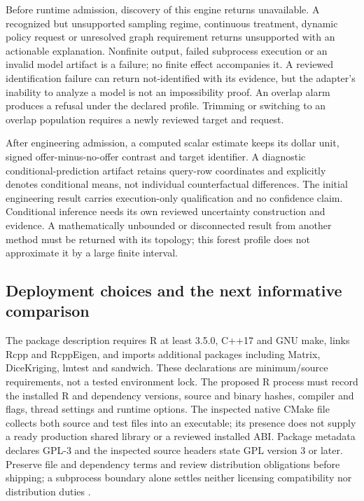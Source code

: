 Before runtime admission, discovery of this engine returns unavailable.
A recognized but unsupported sampling regime, continuous treatment,
dynamic policy request or unresolved graph requirement returns
unsupported with an actionable explanation. Nonfinite output, failed
subprocess execution or an invalid model artifact is a failure; no
finite effect accompanies it. A reviewed identification failure can
return not-identified with its evidence, but the adapter's inability to
analyze a model is not an impossibility proof. An overlap alarm produces
a refusal under the declared profile. Trimming or switching to an
overlap population requires a newly reviewed target and request.

After engineering admission, a computed scalar estimate keeps its dollar
unit, signed offer-minus-no-offer contrast and target identifier. A
diagnostic conditional-prediction artifact retains query-row coordinates
and explicitly denotes conditional means, not individual counterfactual
differences. The initial engineering result carries execution-only
qualification and no confidence claim. Conditional inference needs its
own reviewed uncertainty construction and evidence. A mathematically
unbounded or disconnected result from another method must be returned
with its topology; this forest profile does not approximate it by a
large finite interval.

\subsection{Deployment choices and the next informative comparison}

The package description requires R at least 3.5.0, C++17 and GNU make,
links Rcpp and RcppEigen, and imports additional packages including
Matrix, DiceKriging, lmtest and sandwich. These declarations are
minimum/source requirements, not a tested environment lock. The proposed
R process must record the installed R and dependency versions, source
and binary hashes, compiler and flags, thread settings and runtime
options. The inspected native CMake file collects both source and test
files into an executable; its presence does not supply a ready
production shared library or a reviewed installed ABI. Package metadata
declares GPL-3 and the inspected source headers state GPL version 3 or
later. Preserve file and dependency terms and review distribution
obligations before shipping; a subprocess boundary alone settles neither
licensing compatibility nor distribution duties
\citep{exec13_grf_runtime}.


